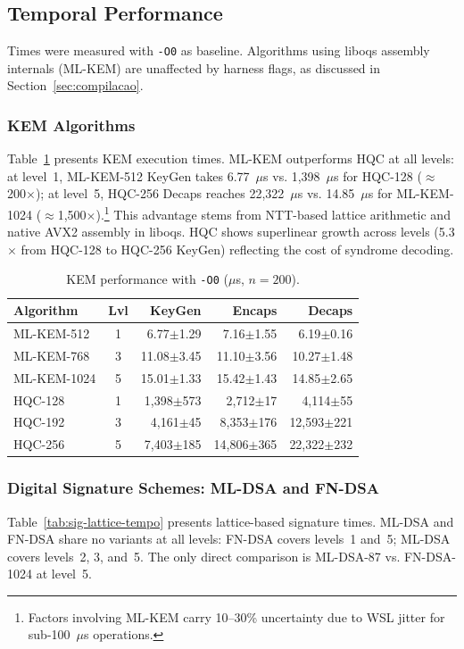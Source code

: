 \documentclass[12pt]{article}
\begin{document}
\subsection{Temporal Performance}
Times were measured with \texttt{-O0} as baseline. Algorithms using liboqs
assembly internals (ML-KEM) are unaffected by harness flags, as discussed
in Section~\ref{sec:compilacao}.

\subsubsection{KEM Algorithms}
Table~\ref{tab:kem-tempo} presents KEM execution times. ML-KEM outperforms
HQC at all levels: at level~1, ML-KEM-512 KeyGen takes 6.77~$\mu$s vs.
1,398~$\mu$s for HQC-128 ($\approx$200$\times$); at level~5, HQC-256 Decaps
reaches 22,322~$\mu$s vs. 14.85~$\mu$s for ML-KEM-1024
($\approx$1,500$\times$).\footnote{Factors involving ML-KEM carry 10--30\%
uncertainty due to WSL jitter for sub-100~$\mu$s operations.} This advantage
stems from NTT-based lattice arithmetic and native AVX2 assembly in liboqs.
HQC shows superlinear growth across levels (5.3$\times$ from HQC-128 to
HQC-256 KeyGen) reflecting the cost of syndrome decoding.

\begin{table}[htbp]
\caption{KEM performance with \texttt{-O0} ($\mu$s, $n=200$).}
\label{tab:kem-tempo}
\centering\small
\begin{tabular}{lcrrr}
\toprule
\textbf{Algorithm} & \textbf{Lvl} & \textbf{KeyGen} & \textbf{Encaps} & \textbf{Decaps} \\
\midrule
ML-KEM-512  & 1 & 6.77$\pm$1.29 & 7.16$\pm$1.55 & 6.19$\pm$0.16 \\
ML-KEM-768  & 3 & 11.08$\pm$3.45 & 11.10$\pm$3.56 & 10.27$\pm$1.48 \\
ML-KEM-1024 & 5 & 15.01$\pm$1.33 & 15.42$\pm$1.43 & 14.85$\pm$2.65 \\
\midrule
HQC-128  & 1 & 1,398$\pm$573 & 2,712$\pm$17 & 4,114$\pm$55 \\
HQC-192  & 3 & 4,161$\pm$45 & 8,353$\pm$176 & 12,593$\pm$221 \\
HQC-256  & 5 & 7,403$\pm$185 & 14,806$\pm$365 & 22,322$\pm$232 \\
\bottomrule
\end{tabular}
\end{table}

\subsubsection{Digital Signature Schemes: ML-DSA and FN-DSA}
\label{subsec:mldsa-fndsa}
Table~\ref{tab:sig-lattice-tempo} presents lattice-based signature times.
ML-DSA and FN-DSA share no variants at all levels: FN-DSA covers levels~1
and~5; ML-DSA covers levels~2, 3, and~5. The only direct comparison is
ML-DSA-87 vs. FN-DSA-1024 at level~5.
\end{document}
